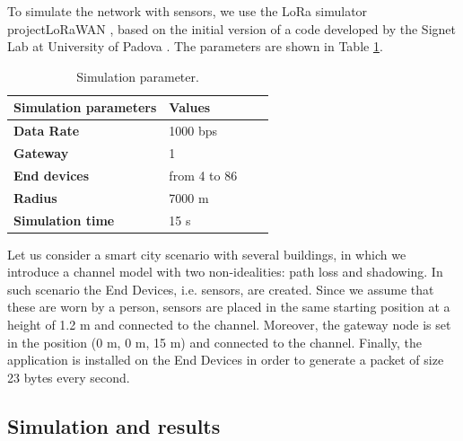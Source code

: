 \documentclass[10pt, a4paper, twocolumn]{article}
\theoremstyle{definition}
\begin{document}
To simulate the network with sensors, we use the LoRa simulator projectLoRaWAN \cite{LoRa_repository}, based on the initial version of a code developed by the Signet Lab at University of Padova \cite{Signet}. The parameters are shown in Table \ref{tab:param}.



\begin{table}\centering
\begin{tabular}{llll}
\textbf{Simulation parameters} & Values\\ \hline
\textbf{Data Rate} & 1000 bps\\
\textbf{Gateway} & 1\\
\textbf{End devices} & from 4 to 86\\
\textbf{Radius} & 7000 m \\
\textbf{Simulation time} & 15 s  
\end{tabular}
\caption{Simulation parameter. }\label{tab:param}  
\end{table}

\par 
Let us consider a smart city scenario with several buildings, in which we introduce a channel model with two non-idealities: path loss and shadowing. In such scenario the End Devices, i.e. sensors, are created. Since we assume that these are worn by a person, sensors are placed in the same starting position at a height of 1.2 m and connected to the channel. Moreover, the gateway node is set in the position (0 m, 0 m, 15 m) and connected to the channel. Finally, the application is installed on the End Devices in order to generate a packet of size 23 bytes every second.










\subsection{Simulation and results}
\end{document}

